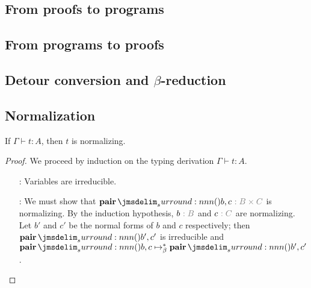 \documentclass[a4paper]{article}
\begin{document}
\subsection{From proofs to programs}
\label{sec:0002}



\subsection{From programs to proofs}
\label{sec:0003}

\subsection{Detour conversion and $\beta$-reduction}
\label{sec:0005}


\subsection{Normalization}
\label{sec:0004}

\begin{theorem}
  If $\Gamma \vdash t : A$, then $t$ is normalizing.
\end{theorem}
\begin{proof}
  We proceed by induction on the typing derivation $\Gamma \vdash t : A$.
  \begin{itemize}
  \item[\rVar:] Variables are irreducible.
  \item[\rProdI:] We must show that $\tmPair{b}{c}\tpAnno{B \times C}$ is normalizing.
    By the induction hypothesis, $b\tpAnno{B}$ and $c\tpAnno{C}$ are normalizing.
    Let $b'$ and $c'$ be the normal forms of $b$ and $c$ respectively; then $\tmPair{b'}{c'}$ is irreducible and $\tmPair{b}{c} \bRed* \tmPair{b'}{c'}$.
  \end{itemize}
\end{proof}
\end{document}
